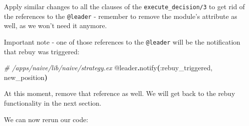 \documentclass[
  oneside]{book}
\newenvironment{Shaded}{\begin{snugshade}}{\end{snugshade}}
\newcommand{\CommentTok}[1]{\textcolor[rgb]{0.56,0.35,0.01}{\textit{#1}}}
\newcommand{\FunctionTok}[1]{\textcolor[rgb]{0.13,0.29,0.53}{\textbf{#1}}}
\newcommand{\NormalTok}[1]{#1}
\newcommand{\OperatorTok}[1]{\textcolor[rgb]{0.81,0.36,0.00}{\textbf{#1}}}
\newcommand{\OtherTok}[1]{\textcolor[rgb]{0.56,0.35,0.01}{#1}}
\newcommand{\VariableTok}[1]{\textcolor[rgb]{0.00,0.00,0.00}{#1}}
\begin{document}
Apply similar changes to all the clauses of the \texttt{execute\_decision/3} to get rid of the references to the \texttt{@leader} - remember to remove the module's attribute as well, as we won't need it anymore.

Important note - one of those references to the \texttt{@leader} will be the notification that rebuy was triggered:

\begin{Shaded}
\begin{Highlighting}[]
    \CommentTok{\# /apps/naive/lib/naive/strategy.ex}
    \OtherTok{@leader}\OperatorTok{.}\NormalTok{notify}\FunctionTok{(}\VariableTok{:rebuy\_triggered}\NormalTok{, new\_position}\FunctionTok{)}
\end{Highlighting}
\end{Shaded}

At this moment, remove that reference as well. We will get back to the rebuy functionality in the next section.

We can now rerun our code:
\end{document}
